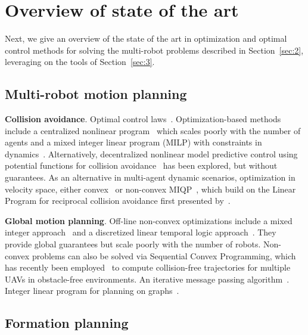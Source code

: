 
\section{Overview of state of the art}\label{sec:4}

Next, we give an overview of the state of the art in optimization and optimal control methods for solving the multi-robot problems described in Section~\ref{sec:2}, leveraging on the tools of Section~\ref{sec:3}.

\subsection{Multi-robot motion planning}

\textbf{Collision avoidance}.
Optimal control laws~\cite{Hoffmann:2008vl}. Optimization-based methods include a centralized nonlinear program~\cite{Raghunathan:2004ga} which scales poorly with the number of agents and a mixed integer linear program (MILP) with constraints in dynamics~\cite{Kuwata:2007vq}.
 Alternatively, decentralized nonlinear model predictive control using potential functions for collision avoidance~\cite{Shim:2003ih} has been explored, but without guarantees.
As an alternative in multi-agent dynamic scenarios, optimization in velocity space, either convex~\cite{snape09, AlonsoMora:2014kb, alonsomora2015auro} or non-convex MIQP~\cite{alonsomora13icra}, which build on the Linear Program for reciprocal collision avoidance first presented by~\cite{vandenberg09}.

\textbf{Global motion planning}.
Off-line non-convex optimizations include a mixed integer approach~\cite{Mellinger:2012fi, Kushleyev:2012wy} and a discretized linear temporal logic approach~\cite{Saha:2014vi}. They provide global guarantees but scale poorly with the number of robots. 
Non-convex problems can also be solved via Sequential Convex Programming, which has recently been employed~\cite{augugliaro12} to compute collision-free trajectories for multiple UAVs in obstacle-free environments. An iterative message passing algorithm~\cite{Bento:2013td}. Integer linear program for planning on graphs~\cite{Yu:2013ij}.

\subsection{Formation planning}


